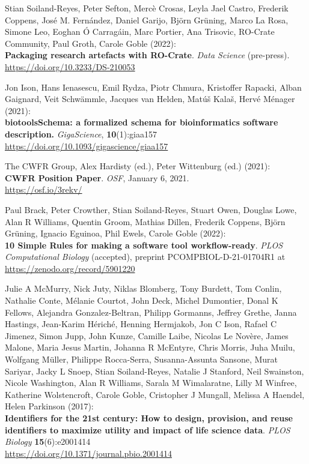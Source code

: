 \begin{thebibliography}{9}
Stian Soiland-Reyes, Peter Sefton, Mercè Crosas, Leyla Jael
Castro, Frederik Coppens, José M. Fernández, Daniel Garijo, Björn
Grüning, Marco La Rosa, Simone Leo, Eoghan Ó Carragáin, Marc Portier,
Ana Trisovic, RO-Crate Community, Paul Groth, Carole Goble (2022):\\
\textbf{Packaging research artefacts with RO-Crate}. \emph{Data Science}
(pre-press).\\
\url{https://doi.org/10.3233/DS-210053}

Jon Ison, Hans Ienasescu, Emil Rydza, Piotr Chmura, Kristoffer
Rapacki, Alban Gaignard, Veit Schwämmle, Jacques van Helden, Matúš
Kalaš, Hervé Ménager (2021):\\
\textbf{biotoolsSchema: a formalized schema for bioinformatics software
description.} \emph{GigaScience}, \textbf{10}(1):giaa157\\
\url{https://doi.org/10.1093/gigascience/giaa157}

The CWFR Group, Alex Hardisty (ed.), Peter Wittenburg (ed.)
(2021):\\
\textbf{CWFR Position Paper}. \emph{OSF}, January 6, 2021.\\
\url{https://osf.io/3rekv/}

Paul Brack, Peter Crowther, Stian Soiland-Reyes, Stuart Owen,
Douglas Lowe, Alan R Williams, Quentin Groom, Mathias Dillen, Frederik
Coppens, Björn Grüning, Ignacio Eguinoa, Phil Ewels, Carole Goble
(2022):\\
\textbf{10 Simple Rules for making a software tool workflow-ready}.
\emph{PLOS Computational Biology} (accepted), preprint
PCOMPBIOL-D-21-01704R1 at \url{https://zenodo.org/record/5901220}

Julie A McMurry, Nick Juty, Niklas Blomberg, Tony Burdett, Tom
Conlin, Nathalie Conte, Mélanie Courtot, John Deck, Michel Dumontier,
Donal K Fellows, Alejandra Gonzalez-Beltran, Philipp Gormanns, Jeffrey
Grethe, Janna Hastings, Jean-Karim Hériché, Henning Hermjakob, Jon C
Ison, Rafael C Jimenez, Simon Jupp, John Kunze, Camille Laibe, Nicolas
Le Novère, James Malone, Maria Jesus Martin, Johanna R McEntyre, Chris
Morris, Juha Muilu, Wolfgang Müller, Philippe Rocca-Serra,
Susanna-Assunta Sansone, Murat Sariyar, Jacky L Snoep, Stian
Soiland-Reyes, Natalie J Stanford, Neil Swainston, Nicole Washington,
Alan R Williams, Sarala M Wimalaratne, Lilly M Winfree, Katherine
Wolstencroft, Carole Goble, Cristopher J Mungall, Melissa A Haendel,
Helen Parkinson (2017):\\
\textbf{Identifiers for the 21st century: How to design, provision, and
reuse identifiers to maximize utility and impact of life science data}.
\emph{PLOS Biology} \textbf{15}(6):e2001414\\
\url{https://doi.org/10.1371/journal.pbio.2001414}


\end{thebibliography}
